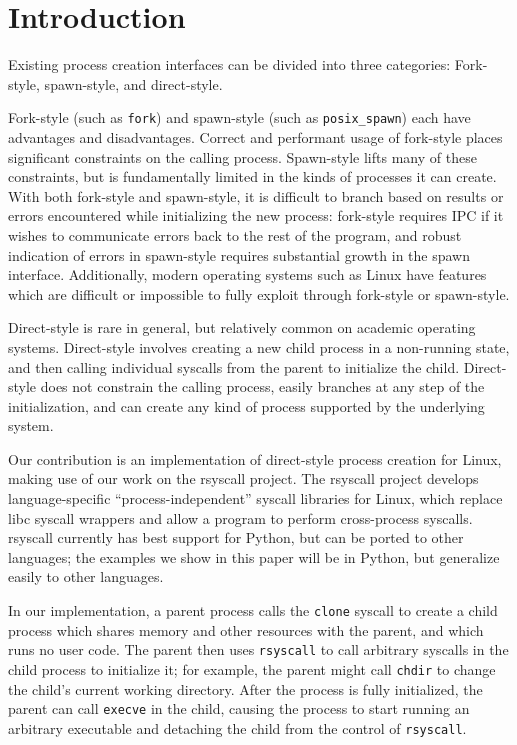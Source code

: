 \documentclass[sigplan]{acmart}
\begin{document}
\section{Introduction}\label{introduction}
Existing process creation interfaces can be divided into three categories:
Fork-style, spawn-style, and direct-style.

Fork-style (such as \texttt{fork}) and spawn-style (such as \texttt{posix\_spawn}) each have advantages and disadvantages.
Correct and performant usage of fork-style places significant constraints on the calling process.
Spawn-style lifts many of these constraints,
but is fundamentally limited in the kinds of processes it can create.
With both fork-style and spawn-style,
it is difficult to
branch based on results or errors encountered while initializing the new process:
fork-style requires IPC if it wishes to communicate errors back to the rest of the program,
and robust indication of errors in spawn-style requires substantial growth in the spawn interface.
Additionally, modern operating systems such as Linux have features
which are difficult or impossible to fully exploit through fork-style or spawn-style.

Direct-style is rare in general, but relatively common on academic operating systems.
\cite{keykos}\cite{sel4}\cite{exokernel}\cite{fuschia}\cite{singularity}
Direct-style involves creating a new child process in a non-running state,
and then calling individual syscalls from the parent to initialize the child.
Direct-style does not constrain the calling process,
easily branches at any step of the initialization,
and can create any kind of process supported by the underlying system.

Our contribution is an implementation of direct-style process creation for Linux,
making use of our work on the rsyscall project.
The rsyscall project develops language-specific ``process-independent'' syscall libraries for Linux,
which replace libc syscall wrappers and allow a program to perform cross-process syscalls.
rsyscall currently has best support for Python,
but can be ported to other languages;
the examples we show in this paper will be in Python,
but generalize easily to other languages.

In our implementation, a parent process calls the \texttt{clone} syscall
to create a child process which shares memory and other resources with the parent,
and which runs no user code.
The parent then uses \texttt{rsyscall}
to call arbitrary syscalls in the child process to initialize it;
for example, the parent might call \texttt{chdir} to change the child's current working directory.
After the process is fully initialized,
the parent can call \texttt{execve} in the child,
causing the process to start running an arbitrary executable
and detaching the child from the control of \texttt{rsyscall}.
\end{document}
